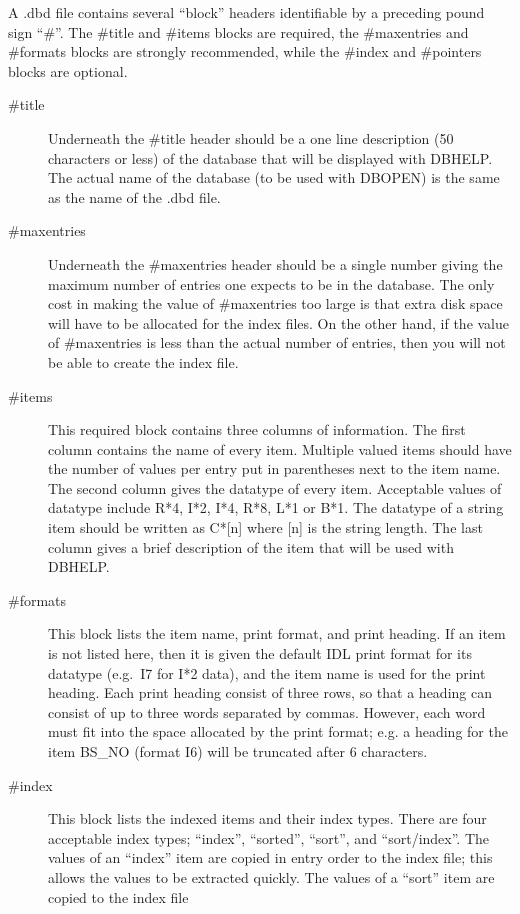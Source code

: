 A .dbd file contains several ``block'' headers identifiable by a 
preceding pound sign ``\#''.  The \#title and \#items blocks are
required, the \#maxentries and \#formats blocks are strongly recommended,
while the \#index and \#pointers blocks are optional.
\begin{description}
\item [\#title] Underneath the \#title header should be a one line description
(50 characters or less) of the database that will be displayed with
DBHELP.  The actual name of the database (to be used with DBOPEN) is the
same as the name of the .dbd file.   
\item [\#maxentries] Underneath the \#maxentries header should be a single
number giving the maximum number of entries one expects to be in the database.
The only cost in making the value of \#maxentries too large is that extra
disk space will have to be allocated for the index files.   On the other
hand, if the value of \#maxentries is less than the actual number of entries,   
then you will not be able to create the index file.
\item [\#items]  This required block contains three columns of information.
The first column contains the name of every item.  Multiple valued items
should have the number of values per entry put in parentheses next to the
item name.
The second column
gives the datatype of every item.  Acceptable values of datatype include
R*4, I*2, I*4, R*8, L*1 or B*1.   The datatype of a string item should be
written as C*[n] where [n] is the string length.  The last column
gives a brief description of the item that will be used with DBHELP.
\item [\#formats] This block lists the item name, print format, and print
heading.  If an item is not listed here, then it is given the default
IDL print format for its datatype (e.g.\ I7 for I*2 data), and the item
name is used for the print heading.  Each print heading consist of three
rows, so that a heading can consist of up to three words separated by
commas.   However, each word must fit into the space allocated by the
print format; e.g. a heading for the item BS\_NO (format I6) will be
truncated after 6 characters.
\item [\#index]  
This block lists the indexed items and their index types.    
There are four acceptable index types; ``index'', ``sorted'',
``sort'', and ``sort/index''.   
The values of an ``index'' item are copied in 
entry order to the index file; this allows the values to be extracted
quickly.   The values of a ``sort'' item are copied to the index file

\end{description}
